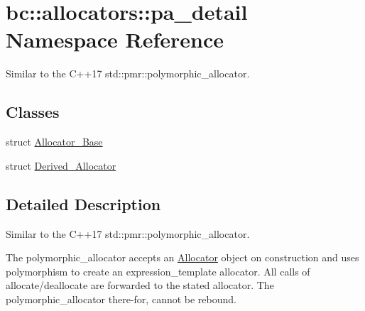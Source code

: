 \hypertarget{namespacebc_1_1allocators_1_1pa__detail}{}\section{bc\+:\+:allocators\+:\+:pa\+\_\+detail Namespace Reference}
\label{namespacebc_1_1allocators_1_1pa__detail}


Similar to the C++17 std\+::pmr\+::polymorphic\+\_\+allocator.  


\subsection*{Classes}
\begin{DoxyCompactItemize}
\item 
struct \hyperlink{structbc_1_1allocators_1_1pa__detail_1_1Allocator__Base}{Allocator\+\_\+\+Base}
\item 
struct \hyperlink{structbc_1_1allocators_1_1pa__detail_1_1Derived__Allocator}{Derived\+\_\+\+Allocator}
\end{DoxyCompactItemize}


\subsection{Detailed Description}
Similar to the C++17 std\+::pmr\+::polymorphic\+\_\+allocator. 

The polymorphic\+\_\+allocator accepts an \hyperlink{classbc_1_1allocators_1_1Allocator}{Allocator} object on construction and uses polymorphism to create an expression\+\_\+template \textquotesingle{}allocator.\textquotesingle{} All calls of allocate/deallocate are forwarded to the stated allocator. The polymorphic\+\_\+allocator there-\/for, cannot be rebound. 